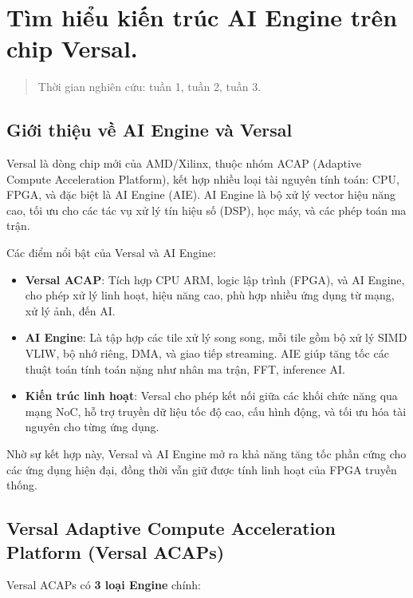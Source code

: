 \chapter{Tìm hiểu kiến trúc AI Engine trên chip Versal.}
\begin{quote}
    Thời gian nghiên cứu: tuần 1, tuần 2, tuần 3.
\end{quote}

\section{Giới thiệu về AI Engine và Versal}

Versal là dòng chip mới của AMD/Xilinx, thuộc nhóm ACAP (Adaptive Compute Acceleration Platform), kết hợp nhiều loại tài nguyên tính toán: CPU, FPGA, và đặc biệt là AI Engine (AIE). AI Engine là bộ xử lý vector hiệu năng cao, tối ưu cho các tác vụ xử lý tín hiệu số (DSP), học máy, và các phép toán ma trận.

Các điểm nổi bật của Versal và AI Engine:
\begin{itemize}
    \item \textbf{Versal ACAP}: Tích hợp CPU ARM, logic lập trình (FPGA), và AI Engine, cho phép xử lý linh hoạt, hiệu năng cao, phù hợp nhiều ứng dụng từ mạng, xử lý ảnh, đến AI.
    \item \textbf{AI Engine}: Là tập hợp các tile xử lý song song, mỗi tile gồm bộ xử lý SIMD VLIW, bộ nhớ riêng, DMA, và giao tiếp streaming. AIE giúp tăng tốc các thuật toán tính toán nặng như nhân ma trận, FFT, inference AI.
    \item \textbf{Kiến trúc linh hoạt}: Versal cho phép kết nối giữa các khối chức năng qua mạng NoC, hỗ trợ truyền dữ liệu tốc độ cao, cấu hình động, và tối ưu hóa tài nguyên cho từng ứng dụng.
\end{itemize}

Nhờ sự kết hợp này, Versal và AI Engine mở ra khả năng tăng tốc phần cứng cho các ứng dụng hiện đại, đồng thời vẫn giữ được tính linh hoạt của FPGA truyền thống.
\section{Versal Adaptive Compute Acceleration Platform (Versal ACAPs)}

Versal ACAPs có \textbf{3 loại Engine} chính:

